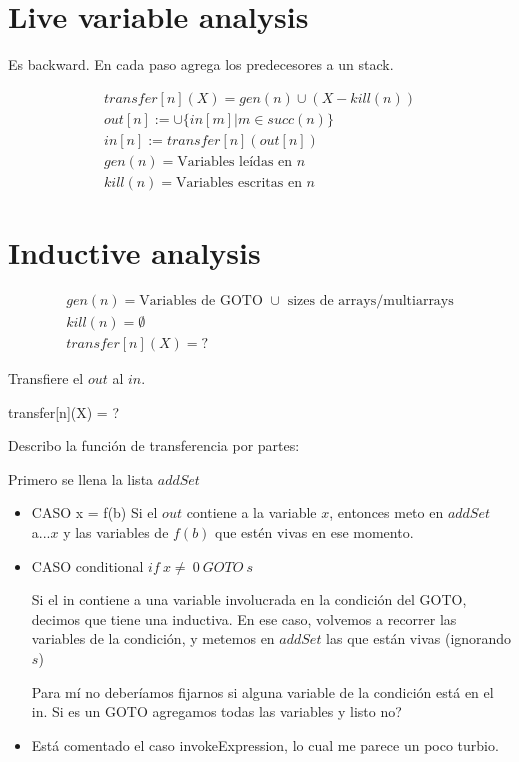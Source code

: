 \documentclass[10pt,a4paper,final]{report}
\begin{document}
\section{Live variable analysis}

Es backward. En cada paso agrega los predecesores a un stack.


\begin{align}
transfer[n](X) = gen(n)\cup (X - kill(n))\\
out[n] := \cup \{in[m] | m \in succ(n) \}\\
in[n] := transfer[n](out[n])\\
gen(n) = \text{Variables leídas en }n\\
kill(n) = \text{Variables escritas en }n
\end{align}

\section{Inductive analysis}

\begin{align}
gen(n) =  \text{Variables de GOTO }\cup\text{ sizes de arrays/multiarrays}\\
kill(n) = \emptyset\\
transfer[n](X) = ?
\end{align}

Transfiere el $out$ al $in$.

transfer[n](X) = ? \bigskip

Describo la función de transferencia por partes:

Primero se llena la lista $addSet$

\begin{itemize}
\item CASO x = f(b)
Si el $out$ contiene a la variable $x$, entonces meto en $addSet$ a...$x$ y las variables de $f(b)$ que estén vivas en ese momento.

\item CASO conditional $if\ x \neq\ 0\ GOTO\ s$

Si el in contiene a una variable involucrada en la condición del GOTO, decimos que tiene una inductiva. En ese caso, volvemos a recorrer las variables de la condición, y metemos en $addSet$ las que están vivas (ignorando $s$)

Para mí no deberíamos fijarnos si alguna variable de la condición está en el in. Si es un GOTO agregamos todas las variables y listo no?\bigskip

\item Está comentado el caso invokeExpression, lo cual me parece un poco turbio.
\end{itemize}
\end{document}
